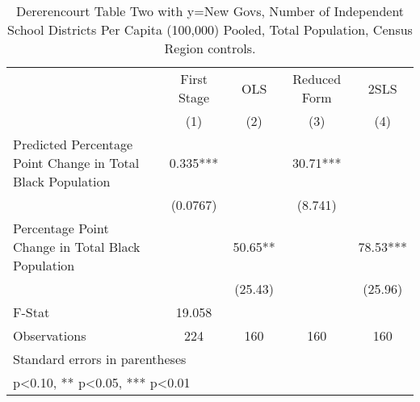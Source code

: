 \begin{table}[htbp]\centering
\def\sym#1{\ifmmode^{#1}\else\(^{#1}\)\fi}
\caption{Dererencourt Table Two with y=New Govs, Number of Independent School Districts Per Capita (100,000) Pooled, Total Population, Census Region controls.}
\begin{tabular}{l*{4}{c}}
\toprule
                    & First Stage   &         OLS   &Reduced Form   &        2SLS   \\
                    &\multicolumn{1}{c}{(1)}   &\multicolumn{1}{c}{(2)}   &\multicolumn{1}{c}{(3)}   &\multicolumn{1}{c}{(4)}   \\
\midrule
Predicted Percentage Point Change in Total Black Population&       0.335***&               &       30.71***&               \\
                    &    (0.0767)   &               &     (8.741)   &               \\
\addlinespace
Percentage Point Change in Total Black Population&               &       50.65** &               &       78.53***\\
                    &               &     (25.43)   &               &     (25.96)   \\
\midrule
F-Stat              &      19.058   &               &               &               \\
Observations        &         224   &         160   &         160   &         160   \\
\bottomrule
\multicolumn{5}{l}{\footnotesize Standard errors in parentheses}\\
\multicolumn{5}{l}{\footnotesize * p<0.10, ** p<0.05, *** p<0.01}\\
\end{tabular}
\end{table}
